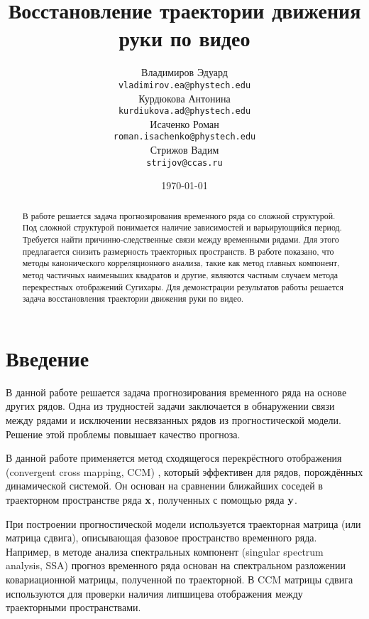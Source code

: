 \documentclass[a4paper, 12pt]{article}
\title{Восстановление траектории движения руки по видео}
\author{Владимиров Эдуард \\
	\texttt{vladimirov.ea@phystech.edu} \\
	
	\And
	Курдюкова Антонина \\
	\texttt{kurdiukova.ad@phystech.edu} \\

	\And
	Исаченко Роман \\
	\texttt{roman.isachenko@phystech.edu} \\
	
	\And
	Стрижов Вадим \\
	\texttt{strijov@ccas.ru}
}
\date{\today}
\begin{document}
\maketitle

\begin{abstract}
	В работе решается задача прогнозирования временного ряда со сложной структурой. Под сложной структурой понимается наличие зависимостей и варьирующийся период. Требуется найти причинно-следственные связи между временными рядами. Для этого предлагается снизить размерность траекторных пространств. В работе показано, что методы канонического корреляционного анализа, такие как метод главных компонент, метод частичных наименьших квадратов и другие, являются частным случаем метода перекрестных отображений Сугихары. Для демонстрации результатов работы решается задача восстановления траектории движения руки по видео.
\end{abstract}



\section{Введение}

В данной работе решается задача прогнозирования временного ряда на основе других рядов. 
Одна из трудностей задачи заключается в обнаружении связи между рядами и исключении несвязанных рядов из прогностической модели. 
Решение этой проблемы повышает качество прогноза.

В данной работе применяется метод сходящегося перекрёстного отображения (convergent cross mapping, CCM) \citep{Sugihara90, sugihara1990nonlinear}, который эффективен для рядов, порождённых динамической системой. 
Он основан на сравнении ближайших соседей в траекторном пространстве ряда $\mathbf{x}$, полученных с помощью ряда $\mathbf{y}$.

При построении прогностической модели используется траекторная матрица (или матрица сдвига), описывающая фазовое пространство временного ряда. 
Например, в методе анализа спектральных компонент (singular spectrum analysis, SSA) \citep{golyandina2005ssa, golyandina2001analysis, zhigljavsky2010singular} прогноз временного ряда основан на спектральном разложении ковариационной матрицы, полученной по траекторной. 
В CCM матрицы сдвига используются для проверки наличия липшицева отображения между траекторными пространствами.
\end{document}
